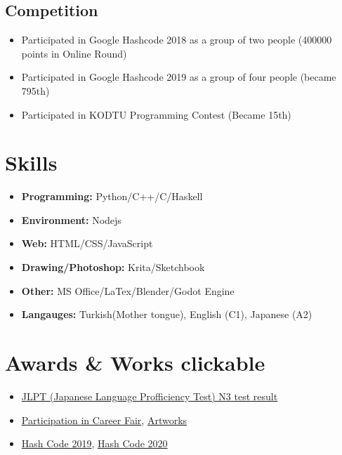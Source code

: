 \documentclass[]{props}
\begin{document}
\subsection{Competition}

\begin{itemize}
    \item[] Participated in Google Hashcode 2018 as a group of two people (400000 points in Online Round)
    \item[] Participated in Google Hashcode 2019 as a group of four people (became 795th)
    \item[] Participated in KODTU Programming Contest (Became 15th)
\end{itemize}

\section{Skills}

\begin{itemize}
    \item[] \textbf{Programming:} Python/C++/C/Haskell
    \item[] \textbf{Environment:} Nodejs
    \item[] \textbf{Web:} HTML/CSS/JavaScript
    \item[] \textbf{Drawing/Photoshop:} Krita/Sketchbook
    \item[] \textbf{Other:} MS Office/LaTex/Blender/Godot Engine 
    \item[] \textbf{Langauges:} Turkish(Mother tongue), English (C1), Japanese (A2)
\end{itemize}

\section{Awards \& Works \large clickable}

\begin{itemize}
    \item[] \href{https://drive.google.com/open?id=16yZOOhfZm_eP2mYEbTYNsRFo7pMLvGrR}{JLPT (Japanese Language Profficiency Test) N3 test result}
    \item[] \href{https://www.sertifier.com/tr/sertifika-goruntule?CertificateNO=302656629386}{Participation in Career Fair}, \href{https://drive.google.com/drive/folders/1NDm0t0LiOj8a82REVYJCP-nU8ECWvNLB}{Artworks}
    \item[] \href{https://codingcompetitions.withgoogle.com/hashcode/certificate/round/0000000000050094}{Hash Code 2019}, \href{https://codingcompetitions.withgoogle.com/hashcode/certificate/round/00000000001a006c}{Hash Code 2020}
\end{itemize}
\end{document}
